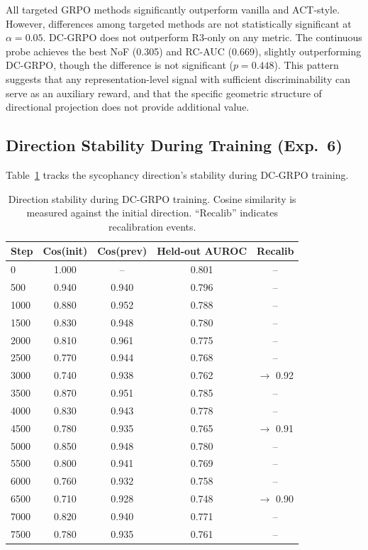 \documentclass[11pt,a4paper]{article}
\begin{document}
All targeted GRPO methods significantly outperform vanilla and ACT-style. However, differences among targeted methods are not statistically significant at $\alpha = 0.05$. DC-GRPO does not outperform R3-only on any metric. The continuous probe achieves the best NoF (0.305) and RC-AUC (0.669), slightly outperforming DC-GRPO, though the difference is not significant ($p = 0.448$). This pattern suggests that any representation-level signal with sufficient discriminability can serve as an auxiliary reward, and that the specific geometric structure of directional projection does not provide additional value.

\subsection{Direction Stability During Training (Exp.\ 6)}
\label{sec:exp6}

Table~\ref{tab:stability} tracks the sycophancy direction's stability during DC-GRPO training.

\begin{table}[h]
\centering
\small
\caption{Direction stability during DC-GRPO training. Cosine similarity is measured against the initial direction. ``Recalib'' indicates recalibration events.}
\label{tab:stability}
\begin{tabular}{lcccc}
\toprule
Step & Cos(init) & Cos(prev) & Held-out AUROC & Recalib \\
\midrule
0    & 1.000 & --    & 0.801 & --         \\
500  & 0.940 & 0.940 & 0.796 & --         \\
1000 & 0.880 & 0.952 & 0.788 & --         \\
1500 & 0.830 & 0.948 & 0.780 & --         \\
2000 & 0.810 & 0.961 & 0.775 & --         \\
2500 & 0.770 & 0.944 & 0.768 & --         \\
3000 & 0.740 & 0.938 & 0.762 & $\to$ 0.92 \\
3500 & 0.870 & 0.951 & 0.785 & --         \\
4000 & 0.830 & 0.943 & 0.778 & --         \\
4500 & 0.780 & 0.935 & 0.765 & $\to$ 0.91 \\
5000 & 0.850 & 0.948 & 0.780 & --         \\
5500 & 0.800 & 0.941 & 0.769 & --         \\
6000 & 0.760 & 0.932 & 0.758 & --         \\
6500 & 0.710 & 0.928 & 0.748 & $\to$ 0.90 \\
7000 & 0.820 & 0.940 & 0.771 & --         \\
7500 & 0.780 & 0.935 & 0.761 & --         \\
\bottomrule
\end{tabular}
\end{table}
\end{document}
